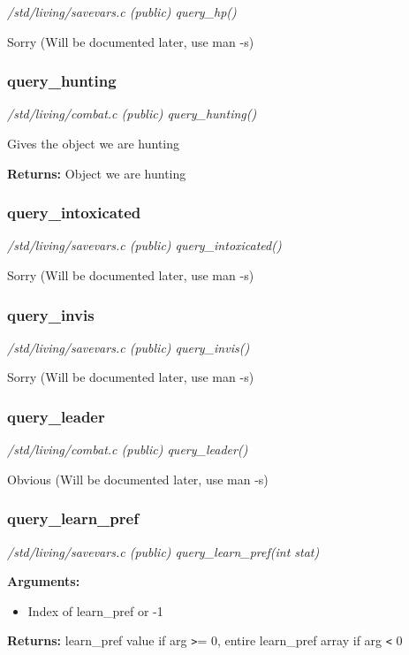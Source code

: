 {\em /std/living/savevars.c (public) query\_hp()}

Sorry (Will be documented later, use man -s)


\subsubsection{query\_hunting}

{\em /std/living/combat.c (public) query\_hunting()}

Gives the object we are hunting

{\bf Returns:}        Object we are hunting


\subsubsection{query\_intoxicated}

{\em /std/living/savevars.c (public) query\_intoxicated()}

Sorry (Will be documented later, use man -s)


\subsubsection{query\_invis}

{\em /std/living/savevars.c (public) query\_invis()}

Sorry (Will be documented later, use man -s)


\subsubsection{query\_leader}

{\em /std/living/combat.c (public) query\_leader()}

Obvious (Will be documented later, use man -s)


\subsubsection{query\_learn\_pref}

{\em /std/living/savevars.c (public) query\_learn\_pref(int stat)}


{\bf Arguments:}
\begin{itemize}
\item        Index of learn\_pref or -1
\end{itemize}

{\bf Returns:}          learn\_pref value if arg \verb+>+= 0, 
entire learn\_pref array if arg \verb+<+ 0



